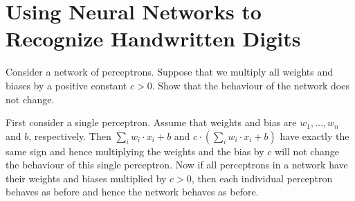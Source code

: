 \chapter{Using Neural Networks to Recognize Handwritten Digits}

\begin{exercise} Consider a network of perceptrons. Suppose that
we multiply all weights and biases by a positive constant $c > 0$. Show 
that the behaviour of the network does not change.
\end{exercise}
\begin{solution}
First consider a single perceptron. Assume that weights and bias are $w_1, \ldots, w_n$ and $b$, respectively. Then $\sum_i w_i \cdot x_i + b$ and 
$c \cdot (\sum_i w_i \cdot x_i + b)$ have exactly the same sign and hence multiplying the weights and the bias by $c$ will not change the behaviour of this single perceptron. Now if all perceptrons in a network have their weights 
and biases multiplied by $c > 0$, then each individual perceptron behaves as before and hence the network behaves as before.
\end{solution}
